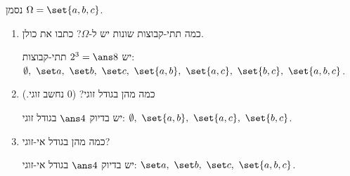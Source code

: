 נסמן $\Omega=\set{a,b,c}$.
\begin{enumerate}
\item כמה תתי-קבוצות שונות יש ל-$\Omega$? כתבו את כולן.
\begin{solbox}
יש $2^3=\ans8$ תתי-קבוצות: $\emptyset,\ \set a,\ \set b,\ \set c,\ \set{a,b},\ \set{a,c},\ \set{b,c},\ \set{a,b,c}$.
\end{solbox}
\item כמה מהן בגודל זוגי? ($0$ נחשב זוגי.)
\begin{solbox}
יש בדיוק $\ans4$ בגודל זוגי: $\emptyset,\ \set{a,b},\ \set{a,c},\ \set{b,c}$.
\end{solbox}
\item כמה מהן בגודל אי-זוגי?
\begin{solbox}
יש בדיוק $\ans4$ בגודל אי-זוגי: $\set a,\ \set b,\ \set c,\ \set{a,b,c}$.
\end{solbox}
\end{enumerate}
